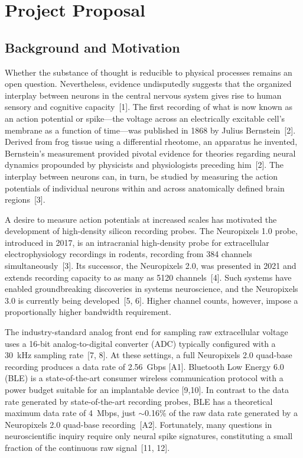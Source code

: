\documentclass[11pt]{article}
\begin{document}
\section*{Project Proposal}

\subsection*{Background and Motivation}
Whether the substance of thought is reducible to physical processes remains an open
question. Nevertheless, evidence undisputedly suggests that the organized interplay between
neurons in the central nervous system gives rise to human sensory and cognitive
capacity~[1]. The first recording of what is now known as an action potential or spike---the voltage 
across an electrically excitable cell's membrane as a function of time---was
published in 1868 by Julius Bernstein~[2]. Derived from frog tissue using a 
differential rheotome, an apparatus he invented, Bernstein's measurement provided 
pivotal evidence for theories regarding neural dynamics propounded by physicists 
and physiologists preceding him~[2]. The interplay between neurons can, in turn, be studied by measuring the action potentials 
of individual neurons within and across anatomically defined brain regions~[3].

A desire to measure action potentials at increased scales has motivated the development of 
high-density silicon recording probes. The Neuropixels 1.0 probe, introduced in 2017, is an intracranial 
high-density probe for extracellular electrophysiology recordings in rodents, recording from 384 
channels simultaneously~[3]. Its successor, the Neuropixels 2.0, was presented in 2021 and extends recording capacity
to as many as 5120 channels~[4]. Such systems have enabled groundbreaking discoveries in
systems neuroscience, and the Neuropixels 3.0 is currently being developed~[5, 6]. 
Higher channel counts, however, impose a proportionally higher bandwidth requirement.

The industry-standard analog front end for sampling raw extracellular voltage uses a 16-bit analog-to-digital converter
(ADC) typically configured with a 30~kHz sampling rate~[7, 8]. At these settings, a full Neuropixels 2.0 
quad-base recording produces a data rate of 2.56~Gbps [A1]. Bluetooth Low Energy 6.0 (BLE) 
is a state-of-the-art consumer wireless communication protocol with a power budget suitable for an implantable device [9,10].
In contrast to the data rate generated by state-of-the-art recording probes, BLE has a theoretical maximum data rate of 4~Mbps, just
$\sim$0.16\% of the raw data rate generated by a Neuropixels 2.0 quad-base recording~[A2]. Fortunately, many questions in neuroscientific 
inquiry require only neural spike signatures, constituting a small fraction of the continuous raw signal~[11, 12].
\end{document}
